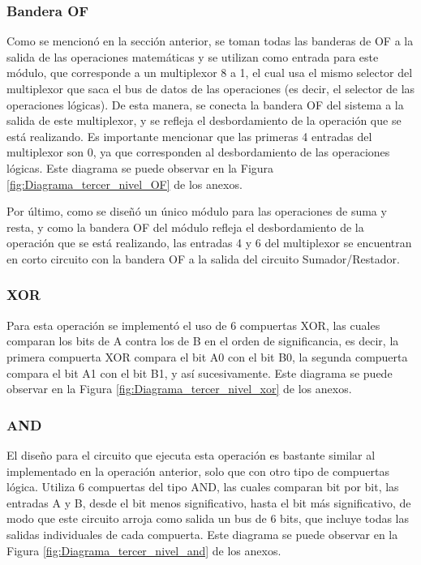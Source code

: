 \documentclass[journal,trans]{IEEEtran}
\begin{document}
\subsubsection{Bandera OF}
Como se mencionó en la sección anterior, se toman todas las banderas de OF a la salida de las operaciones matemáticas y se utilizan como entrada para este módulo, que corresponde a un multiplexor 8 a 1, el cual usa el mismo selector del multiplexor que saca el bus de datos de las operaciones (es decir, el selector de las operaciones lógicas). De esta manera, se conecta la bandera OF del sistema a la salida de este multiplexor, y se refleja el desbordamiento de la operación que se está realizando. Es importante mencionar que las primeras 4 entradas del multiplexor son 0, ya que corresponden al desbordamiento de las operaciones lógicas. Este diagrama se puede observar en la Figura \ref{fig:Diagrama_tercer_nivel_OF} de los anexos. 

Por último, como se diseñó un único módulo para las operaciones de suma y resta, y como la bandera OF del módulo refleja el desbordamiento de la operación que se está realizando, las entradas 4 y 6 del multiplexor se encuentran en corto circuito con la bandera OF a la salida del circuito Sumador/Restador.

\subsubsection{XOR}
Para esta operación se implementó el uso de 6 compuertas XOR, las cuales comparan los bits de A contra los de B en el orden de significancia, es decir, la primera compuerta XOR compara el bit A0 con el bit B0, la segunda compuerta compara el bit A1 con el bit B1, y así sucesivamente. Este diagrama se puede observar en la Figura \ref{fig:Diagrama_tercer_nivel_xor} de los anexos. 

\subsubsection{AND}
El diseño para el circuito que ejecuta esta operación es bastante similar al implementado en la operación anterior, solo que con otro tipo de compuertas lógica. Utiliza 6 compuertas del tipo AND, las cuales comparan bit por bit, las entradas A y B, desde el bit menos significativo, hasta el bit más significativo, de modo que este circuito arroja como salida un bus de 6 bits, que incluye todas las salidas individuales de cada compuerta. Este diagrama se puede observar en la Figura \ref{fig:Diagrama_tercer_nivel_and} de los anexos. 
\end{document}
